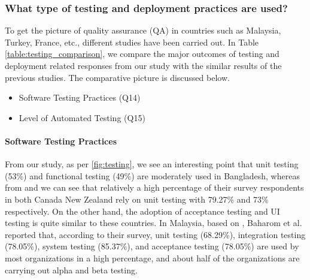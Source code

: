 \subsubsection{What type of testing and deployment practices are used?}

To get the picture of quality assurance (QA) in countries such as Malaysia, Turkey, France, etc., different studies have been carried out. In Table \ref{table:testing_comparison}, we compare the major outcomes of testing and deployment related responses from our study with the similar results of the previous studies. The comparative picture is discussed below.

\begin{itemize}
    \item Software Testing Practices (Q14)
    \item Level of Automated Testing (Q15)
\end{itemize}




\paragraph{Software Testing Practices}
From our study, as per \ref{fig:testing}, we see an interesting point that unit testing (53\%) and functional testing (49\%) are moderately used in Bangladesh, whereas from \cite{Garousi2013} and \cite{Wang2018} we can see that relatively a high percentage of their survey respondents in both Canada New Zealand rely on unit testing with 79.27\% and 73\% respectively. On the other hand, the adoption of acceptance testing and UI testing is quite similar to these countries. In Malaysia, based on \cite{Baharom2006}, Baharom et al. reported that, according to their survey, unit testing (68.29\%), integration testing (78.05\%), system testing (85.37\%), and acceptance testing (78.05\%) are used by most organizations in a high percentage, and about half of the organizations are carrying out alpha and beta testing.


